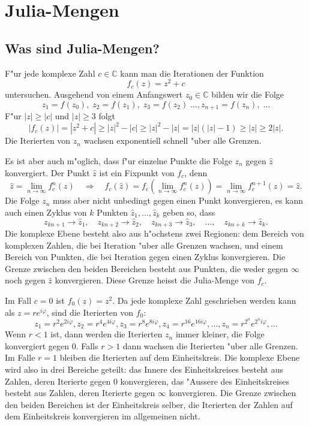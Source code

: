 \chapter{Julia-Mengen}
\begin{refsection}

\section{Was sind Julia-Mengen?}
F"ur jede komplexe Zahl $c\in\mathbb C$ kann man die Iterationen der
Funktion
\begin{equation}
f_c(z)=z^2 + c
\label{julia:quadratic}
\end{equation}
untersuchen.
Ausgehend von einem Anfangswert $z_0\in\mathbb C$ bilden wir die Folge
\[
z_1=f(z_0),\;z_2=f(z_1),\;z_3=f(z_2)\;\dots, z_{n+1}=f(z_n),\;\dots
\]
F"ur $|z|\ge |c|$ und $|z|\ge 3$ folgt
\[
|f_c(z)|= |z^2+c|\ge |z|^2-|c|\ge |z|^2-|z|=|z|(|z|-1)\ge |z|\ge 2|z|.
\]
Die Iterierten von $z_n$ wachsen exponentiell schnell "uber alle Grenzen.

Es ist aber auch m"oglich, dass f"ur einzelne Punkte die Folge $z_n$ 
gegen $\hat z$ konvergiert.
Der Punkt $\hat z$ ist ein Fixpunkt von $f_c$, denn
\[
\hat z = \lim_{n\to \infty}f_c^{n}(z)\quad\Rightarrow\quad
f_c(\hat z)=f_c(\lim_{n\to\infty}f_c^n(z))=\lim_{n\to\infty}f_c^{n+1}(z)=\hat z.
\]
Die Folge $z_n$ muss aber nicht unbedingt gegen einen Punkt konvergieren,
es kann auch einen Zyklus von $k$ Punkten $\hat z_1,\dots,\hat z_k$ geben
so, dass
\[
z_{kn+1}\to \hat z_1,\quad
z_{kn+2}\to \hat z_2,\quad
z_{kn+3}\to \hat z_3,\quad\dots,\quad
z_{kn+k}\to \hat z_k.
\]
Die komplexe Ebene besteht also aus h"ochstens zwei Regionen: dem Bereich
von komplexen Zahlen, die bei Iteration "uber alle Grenzen wachsen, und
einem Bereich von Punkten, die bei Iteration gegen einen Zyklus konvergieren.
Die Grenze zwischen den beiden Bereichen besteht aus Punkten, die weder gegen
$\infty$ noch gegen $\hat z$ konvergieren. Diese Grenze heisst die Julia-Menge
von $f_c$.

\begin{beispiel}
Im Fall $c=0$ ist $f_0(z)=z^2$. Da jede komplexe Zahl geschrieben werden
kann als $z=re^{i\varphi}$, sind die Iterierten von $f_0$:
\[
z_1=r^2e^{2i\varphi},
z_2=r^4e^{4i\varphi},
z_3=r^8e^{8i\varphi},
z_4=r^{16}e^{16i\varphi},\dots,
z_n=r^{2^n}e^{2^ni\varphi},\dots
\]
Wenn $r < 1$ ist, dann werden die Iterierten $z_n$ immer kleiner, die
Folge konvergiert gegen $0$.
Falls $r>1$ dann wachsen die Iterierten "uber alle Grenzen.
Im Falle $r=1$ bleiben die Iterierten auf dem Einheitskreis.
Die komplexe Ebene wird also in drei Bereiche geteilt: das
Innere des Einheitskreises besteht aus Zahlen, deren Iterierte gegen
0 konvergieren, das "Aussere des Einheitskreises besteht aus Zahlen,
deren Iterierte gegen $\infty$ konvergieren.
Die Grenze zwischen den beiden Bereichen ist der Einheitskreis selber,
die Iterierten der Zahlen auf dem Einheitskreis konvergieren im
allgemeinen nicht.


\end{beispiel}
\end{refsection}
